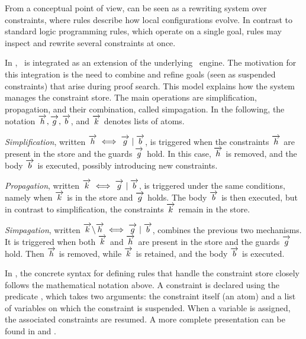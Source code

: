 From a conceptual point of view, \chr can be seen as a rewriting system
over constraints, where rules describe how local configurations evolve.
In contrast to standard logic programming rules, which operate on a
single goal, \chr rules may inspect and rewrite several constraints at
once. 

In \elpi, \chr\ is integrated as an extension of the underlying
\lprolog\ engine. The motivation for this integration is the need to
combine and refine goals (seen as suspended constraints) that arise during proof search.
This model explains how the system manages the constraint store. The
main operations are simplification, propagation, and their combination,
called simpagation.
In the following, the notation $\vecL{h}, \vecL{g}, \vecL{b}$, and
$\vecL{k}$ denotes lists of atoms.

\emph{Simplification}, written
$\vecL{h} \iff \vecL{g} \mid \vecL{b}$, is triggered when the constraints
$\vecL{h}$ are present in the store and the guards $\vecL{g}$ hold. In
this case, $\vecL{h}$ is removed, and the body $\vecL{b}$ is executed,
possibly introducing new constraints.

\emph{Propagation}, written $\vecL{k} \iff \vecL{g} \mid \vecL{b}$, is
triggered under the same conditions, namely when $\vecL{k}$ is in the
store and $\vecL{g}$ holds. The body $\vecL{b}$ is then executed, but in
contrast to simplification, the constraints $\vecL{k}$ remain in the
store.

\emph{Simpagation}, written
$\vecL{k} \backslash \vecL{h} \iff \vecL{g} \mid \vecL{b}$, combines the
previous two mechanisms. It is triggered when both $\vecL{k}$ and
$\vecL{h}$ are present in the store and the guards $\vecL{g}$ hold. Then
$\vecL{h}$ is removed, while $\vecL{k}$ is retained, and the body
$\vecL{b}$ is executed.

In \elpi, the concrete syntax for defining rules that handle the
constraint store closely follows the mathematical notation above. A
constraint is declared using the predicate
, which takes two arguments: the constraint
itself (an atom) and a list of variables on which the constraint is
suspended.
When a variable is assigned, the associated constraints are resumed. 
A more complete presentation can be found in
\cite[Sec.~4.3]{chr-elpi} and \cite[Sec.~2.4]{hdr}.

